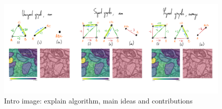 \begin{figure}[t]
\centering
\includegraphics[width=\textwidth,trim=0.4in 1.3in 0.in 0.2in,clip]{./figs/intro_image.jpg} %
\caption{\small 
Intro image: explain algorithm, main ideas and contributions
\label{fig:intro_figure}}
\end{figure}
